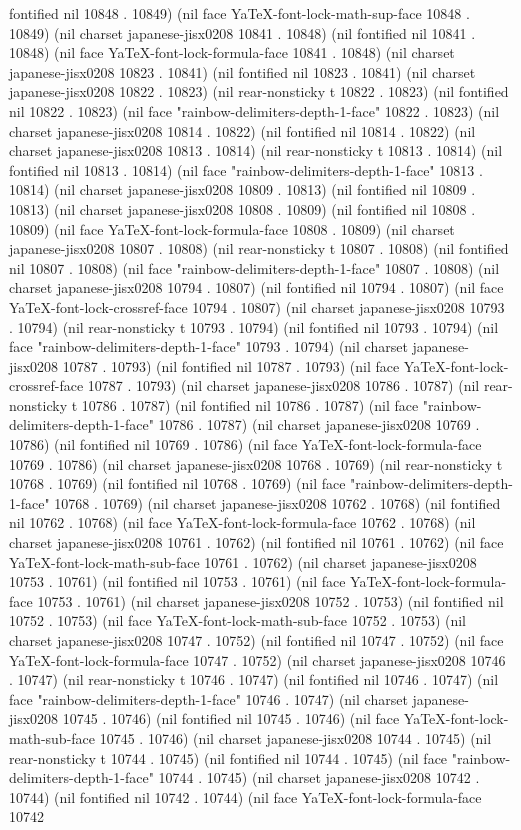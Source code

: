 fontified nil 10848 . 10849) (nil face YaTeX-font-lock-math-sup-face 10848 . 10849) (nil charset japanese-jisx0208 10841 . 10848) (nil fontified nil 10841 . 10848) (nil face YaTeX-font-lock-formula-face 10841 . 10848) (nil charset japanese-jisx0208 10823 . 10841) (nil fontified nil 10823 . 10841) (nil charset japanese-jisx0208 10822 . 10823) (nil rear-nonsticky t 10822 . 10823) (nil fontified nil 10822 . 10823) (nil face "rainbow-delimiters-depth-1-face" 10822 . 10823) (nil charset japanese-jisx0208 10814 . 10822) (nil fontified nil 10814 . 10822) (nil charset japanese-jisx0208 10813 . 10814) (nil rear-nonsticky t 10813 . 10814) (nil fontified nil 10813 . 10814) (nil face "rainbow-delimiters-depth-1-face" 10813 . 10814) (nil charset japanese-jisx0208 10809 . 10813) (nil fontified nil 10809 . 10813) (nil charset japanese-jisx0208 10808 . 10809) (nil fontified nil 10808 . 10809) (nil face YaTeX-font-lock-formula-face 10808 . 10809) (nil charset japanese-jisx0208 10807 . 10808) (nil rear-nonsticky t 10807 . 10808) (nil fontified nil 10807 . 10808) (nil face "rainbow-delimiters-depth-1-face" 10807 . 10808) (nil charset japanese-jisx0208 10794 . 10807) (nil fontified nil 10794 . 10807) (nil face YaTeX-font-lock-crossref-face 10794 . 10807) (nil charset japanese-jisx0208 10793 . 10794) (nil rear-nonsticky t 10793 . 10794) (nil fontified nil 10793 . 10794) (nil face "rainbow-delimiters-depth-1-face" 10793 . 10794) (nil charset japanese-jisx0208 10787 . 10793) (nil fontified nil 10787 . 10793) (nil face YaTeX-font-lock-crossref-face 10787 . 10793) (nil charset japanese-jisx0208 10786 . 10787) (nil rear-nonsticky t 10786 . 10787) (nil fontified nil 10786 . 10787) (nil face "rainbow-delimiters-depth-1-face" 10786 . 10787) (nil charset japanese-jisx0208 10769 . 10786) (nil fontified nil 10769 . 10786) (nil face YaTeX-font-lock-formula-face 10769 . 10786) (nil charset japanese-jisx0208 10768 . 10769) (nil rear-nonsticky t 10768 . 10769) (nil fontified nil 10768 . 10769) (nil face "rainbow-delimiters-depth-1-face" 10768 . 10769) (nil charset japanese-jisx0208 10762 . 10768) (nil fontified nil 10762 . 10768) (nil face YaTeX-font-lock-formula-face 10762 . 10768) (nil charset japanese-jisx0208 10761 . 10762) (nil fontified nil 10761 . 10762) (nil face YaTeX-font-lock-math-sub-face 10761 . 10762) (nil charset japanese-jisx0208 10753 . 10761) (nil fontified nil 10753 . 10761) (nil face YaTeX-font-lock-formula-face 10753 . 10761) (nil charset japanese-jisx0208 10752 . 10753) (nil fontified nil 10752 . 10753) (nil face YaTeX-font-lock-math-sub-face 10752 . 10753) (nil charset japanese-jisx0208 10747 . 10752) (nil fontified nil 10747 . 10752) (nil face YaTeX-font-lock-formula-face 10747 . 10752) (nil charset japanese-jisx0208 10746 . 10747) (nil rear-nonsticky t 10746 . 10747) (nil fontified nil 10746 . 10747) (nil face "rainbow-delimiters-depth-1-face" 10746 . 10747) (nil charset japanese-jisx0208 10745 . 10746) (nil fontified nil 10745 . 10746) (nil face YaTeX-font-lock-math-sub-face 10745 . 10746) (nil charset japanese-jisx0208 10744 . 10745) (nil rear-nonsticky t 10744 . 10745) (nil fontified nil 10744 . 10745) (nil face "rainbow-delimiters-depth-1-face" 10744 . 10745) (nil charset japanese-jisx0208 10742 . 10744) (nil fontified nil 10742 . 10744) (nil face YaTeX-font-lock-formula-face 10742 